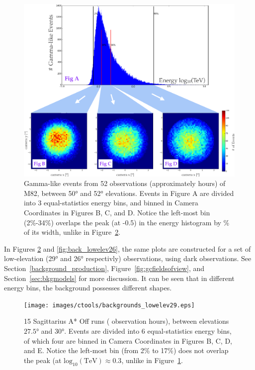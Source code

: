     \begin{figure}[ht]
      \centering
      \includegraphics[width=\textwidth]{images/ctools/backgrounds_highelev.eps}
      \caption[FITS Background at \ang{50} Elevation]{
        Gamma-like events from 52 observations (approximately  hours) of M82, between \ang{50} and \ang{52} elevations.
        Events in Figure A are divided into 3 equal-statistics energy bins, and binned in Camera Coordinates in Figures B, C, and D.
        Notice the left-most bin (2\%-34\%) overlaps the peak (at -0.5) in the energy histogram by \% of its width, unlike in Figure~\ref{fig:back_lowelev29}.
      }
      \label{fig:back_highelev}
    \end{figure}

    In Figures \ref{fig:back_lowelev29} and \ref{fig:back_lowelev26}, the same plots are constructed for a set of low-elevation (\nicetilde{}\ang{29} and \nicetilde{}\ang{26} respectivly) observations, using dark observations.
    See Section~\ref{background_production}, Figure~\ref{fig:gcfieldsofview}, and Section~\ref{sec:bkgmodels} for more discussion.
    It can be seen that in different energy bins, the background possesses different shapes.

    \begin{figure}[ht]
      \centering
      \texttt{[image: images/ctools/backgrounds\_lowelev29.eps]}
      \caption[CTOOLS Background at \ang{29} Elevation]{
        15 Sagittarius A* Off runs ( observation hours), between elevations $ \ang{27.5} $ and $ \ang{30} $.
        Events are divided into 6 equal-statistics energy bins, of which four are binned in Camera Coordinates in Figures B, C, D, and E.
        Notice the left-most bin (from 2\% to 17\%) does not overlap the peak (at $\textrm{log}_{10}\left ( \textrm{TeV} \right ) \approx 0.3$, unlike in Figure~\ref{fig:back_highelev}.
      }
      \label{fig:back_lowelev29}
    \end{figure}

